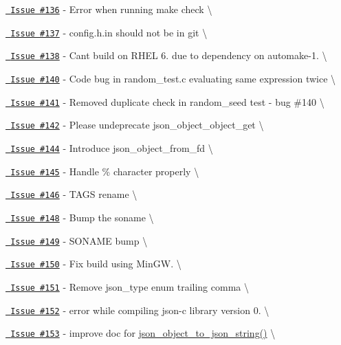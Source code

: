 \begin{DoxyItemize}
\item \href{https://github.com/json-c/json-c/issues/136}{\texttt{ Issue \#136}} -\/ Error when running make check \textbackslash{}
\item \href{https://github.com/json-c/json-c/issues/137}{\texttt{ Issue \#137}} -\/ config.\+h.\+in should not be in git \textbackslash{}
\item \href{https://github.com/json-c/json-c/issues/138}{\texttt{ Issue \#138}} -\/ Can\textquotesingle{}t build on RHEL 6. due to dependency on automake-\/1. \textbackslash{}
\item \href{https://github.com/json-c/json-c/issues/140}{\texttt{ Issue \#140}} -\/ Code bug in random\+\_\+test.\+c evaluating same expression twice \textbackslash{}
\item \href{https://github.com/json-c/json-c/issues/141}{\texttt{ Issue \#141}} -\/ Removed duplicate check in random\+\_\+seed test -\/ bug \#140 \textbackslash{}
\item \href{https://github.com/json-c/json-c/issues/142}{\texttt{ Issue \#142}} -\/ Please undeprecate json\+\_\+object\+\_\+object\+\_\+get \textbackslash{}
\item \href{https://github.com/json-c/json-c/issues/144}{\texttt{ Issue \#144}} -\/ Introduce json\+\_\+object\+\_\+from\+\_\+fd \textbackslash{}
\item \href{https://github.com/json-c/json-c/issues/145}{\texttt{ Issue \#145}} -\/ Handle \% character properly \textbackslash{}
\item \href{https://github.com/json-c/json-c/issues/146}{\texttt{ Issue \#146}} -\/ TAGS rename \textbackslash{}
\item \href{https://github.com/json-c/json-c/issues/148}{\texttt{ Issue \#148}} -\/ Bump the soname \textbackslash{}
\item \href{https://github.com/json-c/json-c/issues/149}{\texttt{ Issue \#149}} -\/ SONAME bump \textbackslash{}
\item \href{https://github.com/json-c/json-c/issues/150}{\texttt{ Issue \#150}} -\/ Fix build using Min\+GW. \textbackslash{}
\item \href{https://github.com/json-c/json-c/issues/151}{\texttt{ Issue \#151}} -\/ Remove json\+\_\+type enum trailing comma \textbackslash{}
\item \href{https://github.com/json-c/json-c/issues/152}{\texttt{ Issue \#152}} -\/ error while compiling json-\/c library version 0. \textbackslash{}
\item \href{https://github.com/json-c/json-c/issues/153}{\texttt{ Issue \#153}} -\/ improve doc for \mbox{\hyperlink{json__object_8h_ab7390c22baa1700d977c2af6b22d43a4}{json\+\_\+object\+\_\+to\+\_\+json\+\_\+string()}} \textbackslash{}

\end{DoxyItemize}
